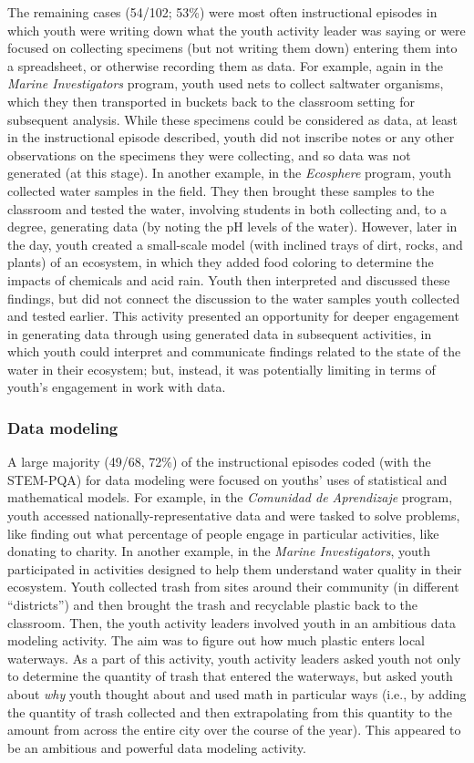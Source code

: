 \documentclass[]{book}
\theoremstyle{definition}
\theoremstyle{definition}
\theoremstyle{definition}
\theoremstyle{remark}
\begin{document}
The remaining cases (54/102; 53\%) were most often instructional
episodes in which youth were writing down what the youth activity leader
was saying or were focused on collecting specimens (but not writing them
down) entering them into a spreadsheet, or otherwise recording them as
data. For example, again in the \emph{Marine Investigators} program,
youth used nets to collect saltwater organisms, which they then
transported in buckets back to the classroom setting for subsequent
analysis. While these specimens could be considered as data, at least in
the instructional episode described, youth did not inscribe notes or any
other observations on the specimens they were collecting, and so data
was not generated (at this stage). In another example, in the
\emph{Ecosphere} program, youth collected water samples in the field.
They then brought these samples to the classroom and tested the water,
involving students in both collecting and, to a degree, generating data
(by noting the pH levels of the water). However, later in the day, youth
created a small-scale model (with inclined trays of dirt, rocks, and
plants) of an ecosystem, in which they added food coloring to determine
the impacts of chemicals and acid rain. Youth then interpreted and
discussed these findings, but did not connect the discussion to the
water samples youth collected and tested earlier. This activity
presented an opportunity for deeper engagement in generating data
through using generated data in subsequent activities, in which youth
could interpret and communicate findings related to the state of the
water in their ecosystem; but, instead, it was potentially limiting in
terms of youth's engagement in work with data.

\subsubsection{Data modeling}\label{data-modeling}

A large majority (49/68, 72\%) of the instructional episodes coded (with
the STEM-PQA) for data modeling were focused on youths' uses of
statistical and mathematical models. For example, in the \emph{Comunidad
de Aprendizaje} program, youth accessed nationally-representative data
and were tasked to solve problems, like finding out what percentage of
people engage in particular activities, like donating to charity. In
another example, in the \emph{Marine Investigators}, youth participated
in activities designed to help them understand water quality in their
ecosystem. Youth collected trash from sites around their community (in
different ``districts'') and then brought the trash and recyclable
plastic back to the classroom. Then, the youth activity leaders involved
youth in an ambitious data modeling activity. The aim was to figure out
how much plastic enters local waterways. As a part of this activity,
youth activity leaders asked youth not only to determine the quantity of
trash that entered the waterways, but asked youth about \emph{why} youth
thought about and used math in particular ways (i.e., by adding the
quantity of trash collected and then extrapolating from this quantity to
the amount from across the entire city over the course of the year).
This appeared to be an ambitious and powerful data modeling activity.
\end{document}

